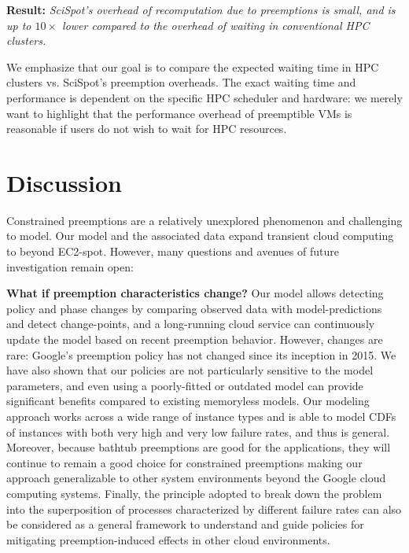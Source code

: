 \documentclass[compsoc]{IEEEtran}
\newcommand{\sysname}{SciSpot\xspace}
\newcommand{\subsecspace}[0]{-0.20cm}
\begin{document}
\noindent \textbf{Result:} \emph{\sysname's overhead of recomputation due to preemptions is small, and is up to $10\times$ lower compared to the overhead of waiting in conventional HPC clusters. }

We emphasize that our goal is to compare the expected waiting time in HPC clusters vs. SciSpot's preemption overheads.
The exact waiting time and performance is dependent on the specific HPC scheduler and hardware: we merely want to highlight that the performance overhead of preemptible VMs is reasonable if users do not wish to wait for HPC resources. 










 

\vspace*{\subsecspace}
\section{Discussion}
\label{sec:discussion}


Constrained preemptions are a relatively unexplored phenomenon and challenging to model.
Our model and the associated data expand transient cloud computing to beyond EC2-spot.
However, many questions and avenues of future investigation remain open:

\noindent \textbf{What if preemption characteristics change?}
Our model allows detecting policy and phase changes by comparing observed data with model-predictions and detect change-points, and 
a long-running cloud service can continuously update the model based on recent preemption behavior. 
However, changes are rare: Google's preemption policy has not changed since its inception in 2015. 
We have also shown that our policies are not particularly sensitive to the model parameters, and even using a poorly-fitted or outdated model can provide significant benefits compared to existing memoryless models. 
Our modeling approach works across a wide range of instance types and is able to model CDFs of instances with both very high and very low failure rates, and thus is general. Moreover, because bathtub preemptions are good for the applications, they will continue to remain a good choice for constrained preemptions making our approach generalizable to other system environments beyond the Google cloud computing systems. Finally, the principle adopted to break down the problem into the superposition of processes characterized by different failure rates can also be considered as a general framework to understand and guide policies for mitigating preemption-induced effects in other cloud environments.
\end{document}
